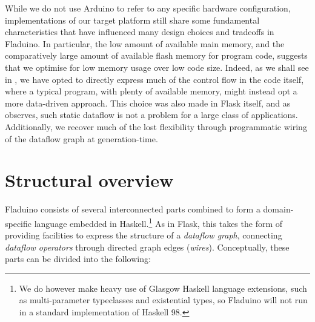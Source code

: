 \documentclass[a4paper, oneside, final]{memoir}
\let\fref\undefined
\begin{document}
While we do not use Arduino to refer to any specific hardware
configuration, implementations of our target platform still share some
fundamental characteristics that have influenced many design choices
and tradeoffs in Fladuino.  In particular, the low amount of available
main memory, and the comparatively large amount of available flash
memory for program code, suggests that we optimise for low memory
usage over low code size.  Indeed, as we shall see in
\fref{sec:dataflowtranslation}, we have opted to directly express much of
the control flow in the code itself, where a typical program, with
plenty of available memory, might instead opt a more data-driven
approach.  This choice was also made in Flask itself, and as
\cite{flask08} observes, such static dataflow is not a problem for a
large class of applications.  Additionally, we recover much of the
lost flexibility through programmatic wiring of the dataflow graph at
generation-time.

\section{Structural overview}

Fladuino consists of several interconnected parts combined to form a
domain-specific language embedded in Haskell.\footnote{We do however
  make heavy use of Glasgow Haskell language extensions, such as
  multi-parameter typeclasses and existential types, so Fladuino will
  not run in a standard implementation of Haskell 98.}  As in Flask,
this takes the form of providing facilities to express the structure
of a \textit{dataflow graph}, connecting \textit{dataflow operators}
through directed graph edges (\textit{wires}).  Conceptually, these
parts can be divided into the following:
\end{document}
